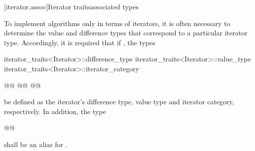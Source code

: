 [iterator.assoc]{Iterator \textcolor{remclr}{traits}\textcolor{addclr}{associated types}}

\pnum
To implement algorithms only in terms of iterators, it is often necessary to
determine the value and
difference types that correspond to a particular iterator type.
Accordingly, it is required that if
, the types

\begin{removedblock}
\begin{codeblock}
iterator_traits<Iterator>::difference_type
iterator_traits<Iterator>::value_type
iterator_traits<Iterator>::iterator_category
\end{codeblock}
\end{removedblock}
\begin{addedblock}
\begin{codeblock}
@@
@@
@@
\end{codeblock}
\end{addedblock}

be defined as the iterator's difference type, value type and iterator category, respectively.
In addition, the type

\begin{addedblock}
\begin{codeblock}
@@
\end{codeblock}

shall be an alias for .
\end{addedblock}

